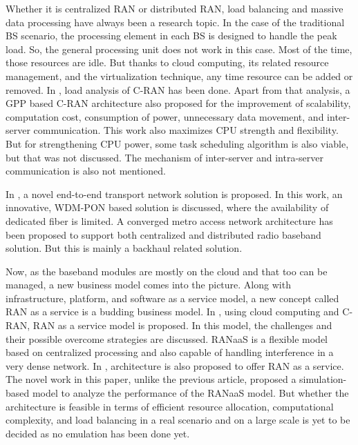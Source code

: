 \begin{multicols}{2}
Whether it is centralized RAN or distributed RAN, load balancing and massive data processing have always been a research topic. In the case of the traditional BS scenario, the processing element in each BS is designed to handle the peak load. So, the general processing unit does not work in this case. Most of the time, those resources are idle. But thanks to cloud computing, its related resource management, and the virtualization technique, any time resource can be added or removed. In \cite{art3-key14}, load analysis of C-RAN has been done. Apart from that analysis, a GPP based C-RAN architecture also proposed for the improvement of scalability, computation cost, consumption of power, unnecessary data movement, and inter-server communication. This work also maximizes CPU strength and flexibility. But for strengthening CPU power, some task scheduling algorithm is also viable, but that was not discussed. The mechanism of inter-server and intra-server communication is also not mentioned.

In \cite{art3-key15}, a novel end-to-end transport network solution is proposed. In this work, an innovative, WDM-PON based solution is discussed, where the availability of dedicated fiber is limited. A converged metro access network architecture has been proposed to support both centralized and distributed radio baseband solution. But this is mainly a backhaul related solution.

Now, as the baseband modules are mostly on the cloud and that too can be managed, a new business model comes into the picture. Along with infrastructure, platform, and software as a service model, a new concept called RAN as a service is a budding business model. In \cite{art3-key16}, using cloud computing and C-RAN, RAN as a service model is proposed. In this model, the challenges and their possible overcome strategies are discussed. RANaaS is a flexible model based on centralized processing and also capable of handling interference in a very dense network. In \cite{art3-key17}, architecture is also proposed to offer RAN as a service. The novel work in this paper, unlike the previous article, proposed a simulation-based model to analyze the performance of the RANaaS model. But whether the architecture is feasible in terms of efficient resource allocation, computational complexity, and load balancing in a real scenario and on a large scale is yet to be decided as no emulation has been done yet.


\end{multicols}
